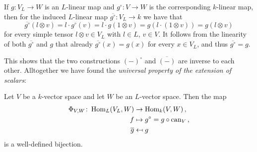 \begin{fluff}
  If $g \colon V_L \to W$ is an $L$-linear map and $g^\circ \colon V \to W$ is the corresponding $k$-linear map, then for the induced $L$-linear map $\overline{g^\circ} \colon V_L \to k$ we have that
  \[
      \overline{g^\circ}(l \otimes v)
    = l \cdot g^\circ(v)
    = l \cdot g(1 \otimes v)
    = g(l \cdot (1 \otimes v))
    = g(l \otimes v)
  \]
  for every simple tensor $l \otimes v \in V_L$ with $l \in L$, $v \in V$.
  It follows from the linearity of both $\overline{g^\circ}$ and $g$ that already $\overline{g^\circ}(x) = g(x)$ for every $x \in V_L$, and thus $\overline{g^\circ} = g$.
  
  This shows that the two constructions $(-)^\circ$ and $\overline{(-)}$ are inverse to each other.
  Alltogether we have found the \emph{universal property of the extension of scalars}:
\end{fluff}


\begin{theorem}
  \label{theorem: universal property of extension of scalars}
  Let $V$ be a $k$-vector space and let $W$ be an $L$-vector space.
  Then the map
  \begin{align*}
                \Phi_{V,W}
    \colon      \operatorname{Hom}_L(V_L, W)
    &\to        \operatorname{Hom}_k(V,W) \,, \\
                f
    &\mapsto    g^\circ
     =          g \circ \operatorname{can}_V \,,  \\
                \overline{g}
    &\mapsfrom  g
  \end{align*}
  is a well-defined bijection.
\end{theorem}



